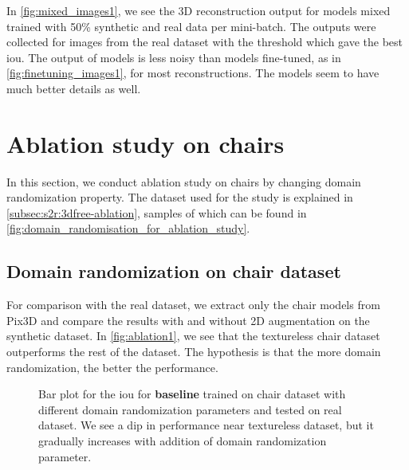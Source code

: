 In \autoref{fig:mixed_images1}, we see the 3D reconstruction output for models mixed trained with 50\% synthetic and real data per mini-batch.
The outputs were collected for images from the real dataset with the threshold which gave the best \gls{iou}.
The output of models is less noisy than models fine-tuned, as in \autoref{fig:finetuning_images1}, for most reconstructions.
The models seem to have much better details as well.


\section{Ablation study on chairs}\label{sec:ablation-study-on-chairs}
In this section, we conduct ablation study on chairs by changing domain randomization property.
The dataset used for the study is explained in \autoref{subsec:s2r:3dfree-ablation}, samples of which can be found in \autoref{fig:domain_randomisation_for_ablation_study}.

\subsection{Domain randomization on chair dataset}\label{subsec:domain-randomisation-on-chair-dataset}
For comparison with the real dataset, we extract only the chair models from Pix3D and compare the results  with and without 2D augmentation on the synthetic dataset.
In \autoref{fig:ablation1}, we see that the textureless chair dataset outperforms the rest of the dataset.
The hypothesis is that the more domain randomization, the better the performance.

\begin{figure}[ht]
    \centering
    \resizebox{0.9\textwidth}{!}{}
    \caption{Bar plot for the \gls{iou} for \textbf{baseline} trained on chair dataset with different domain randomization parameters and tested on real dataset.
    We see a dip in performance near textureless dataset, but it gradually increases with addition of domain randomization parameter.}
    \label{fig:ablation1}
\end{figure}


